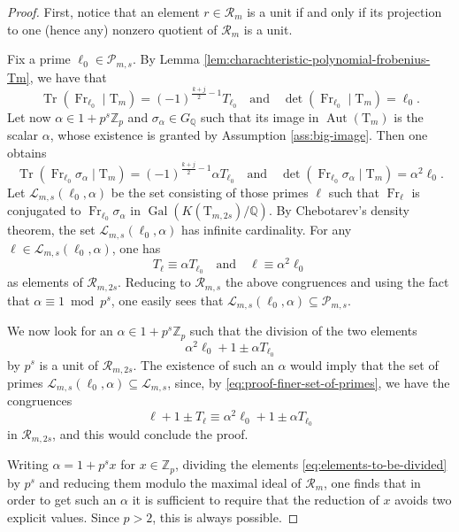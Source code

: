 \documentclass[12pt,reqno]{amsart}
\theoremstyle{definition}
\theoremstyle{remark}
\newcommand{\numberset}{\mathbb}
\newcommand{\Q}{\numberset{Q}}
\newcommand{\Z}{\numberset{Z}}
\newcommand{\T}{\boldsymbol{\mathrm{T}}}
\newcommand{\calR}{\mathcal{R}}
\DeclareMathOperator{\Gal}{Gal}
\DeclareMathOperator{\Tr}{Tr}
\DeclareMathOperator{\Aut}{Aut}
\DeclareMathOperator{\Fr}{Fr}
\newcommand{\ga}{\alpha}
\newcommand{\gs}{\sigma}
\begin{document}
\begin{proof}
    First, notice that an element $r\in\mathcal{R}_m$ is a unit if and only if its projection to one (hence any) nonzero quotient of $\calR_m$ is a unit.

    Fix a prime $\ell_0\in\mathcal{P}_{m,s}$. By Lemma \ref{lem:charachteristic-polynomial-frobenius-Tm}, we have that
    \begin{equation*}
        \Tr(\Fr_{\ell_0}\mid \T_m)=(-1)^{\frac{k+j}{2}-1}T_{\ell_0}\quad\text{and}\quad\det(\Fr_{\ell_0}\mid \T_m)=\ell_0.
    \end{equation*}
    Let now $\ga\in 1+p^s\Z_p$ and $\gs_\ga\in G_\Q$ such that its image in $\Aut(\T_m)$ is the scalar $\ga$, whose existence is granted by Assumption \ref{ass:big-image}. Then one obtains
    \begin{equation*}
        \Tr(\Fr_{\ell_0}\gs_\ga\mid \T_m)=(-1)^{\frac{k+j}{2}-1}\ga T_{\ell_0}\quad\text{and}\quad\det(\Fr_{\ell_0}\gs_\ga\mid \T_m)=\ga^2\ell_0.
    \end{equation*}
    Let $\mathcal{L}_{m,s}(\ell_0, \alpha)$ be the set consisting of those primes $\ell$ such that $\Fr_\ell$ is conjugated to $\Fr_{\ell_0}\gs_\ga$ in $\Gal(K(\T_{m,2s})/\Q)$. By Chebotarev's density theorem, the set $\mathcal{L}_{m,s}(\ell_0, \alpha)$ has infinite cardinality. For any $\ell\in\mathcal{L}_{m,s}(\ell_0, \alpha)$, one has
    \begin{equation}\label{eq:proof-finer-set-of-primes}
        T_{\ell}\equiv \ga T_{\ell_0}\quad\text{and}\quad \ell\equiv\ga^2\ell_0
    \end{equation}
    as elements of $\calR_{m,2s}$. Reducing to $\calR_{m,s}$ the above congruences and using the fact that $\ga\equiv 1\bmod p^s$, one easily sees that $\mathcal{L}_{m,s}(\ell_0, \alpha)\subseteq\mathcal{P}_{m,s}$. 

    We now look for an $\ga\in 1+p^s\Z_p$ such that the division of the two elements
    \begin{equation}\label{eq:elements-to-be-divided}
        \ga^2\ell_0+1\pm\ga T_{\ell_0}
    \end{equation}
    by $p^s$ is a unit of $\mathcal{R}_{m,2s}$. The existence of such an $\ga$ would imply that the set of primes $\mathcal{L}_{m,s}(\ell_0,\ga)\subseteq\mathcal{L}_{m,s}$, since, by \eqref{eq:proof-finer-set-of-primes}, we have the congruences
    \begin{equation*}
        \ell+1\pm T_\ell\equiv \ga^2\ell_0+1\pm\ga T_{\ell_0}
    \end{equation*}
    in $\calR_{m,2s}$, and this would conclude the proof.

    Writing $\alpha=1+p^{s}x$ for $x\in\Z_p$, dividing the elements \eqref{eq:elements-to-be-divided} by $p^s$ and reducing them modulo the maximal ideal of $\mathcal{R}_m$, one finds that in order to get such an $\alpha$ it is sufficient to require that the reduction of $x$ avoids two explicit values. Since $p>2$, this is always possible.
\end{proof}
\end{document}
